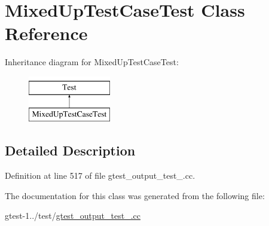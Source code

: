 \hypertarget{classfoo_1_1MixedUpTestCaseTest}{\section{\-Mixed\-Up\-Test\-Case\-Test \-Class \-Reference}
\label{dd/d62/classfoo_1_1MixedUpTestCaseTest}
}
\-Inheritance diagram for \-Mixed\-Up\-Test\-Case\-Test\-:\begin{figure}[H]
\begin{center}
\leavevmode
\includegraphics[height=2.000000cm]{dd/d62/classfoo_1_1MixedUpTestCaseTest}
\end{center}
\end{figure}


\subsection{\-Detailed \-Description}


\-Definition at line 517 of file gtest\-\_\-output\-\_\-test\-\_\-.\-cc.



\-The documentation for this class was generated from the following file\-:\begin{DoxyCompactItemize}
\item 
gtest-\/1../test/\hyperlink{gtest__output__test___8cc}{gtest\-\_\-output\-\_\-test\-\_\-.\-cc}\end{DoxyCompactItemize}
